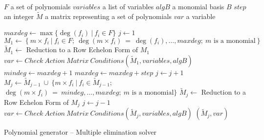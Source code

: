 \begin{algorithm}[ht]
  \begin{algorithmic}[1]
    \Require
      \Statex $F$ a set of polynomials
      \Statex $variables$ a list of variables
      \Statex $algB$ a monomial basis $B$
      \Statex $step$ an integer
    \Ensure
      \Statex $\tilde{M}$ a matrix representing a set of polynomials
      \Statex $var$ a variable
      \Statex

      \State $maxdeg \gets \max\{\deg(f_i)\ |\ f_i \in F\}$
      \State $j \gets 1$
      \State $M_1 \gets \left\{m\times f_i\ |\ f_i \in F;\ \deg(m\times f_i)\ =\ \deg(f_i),\dots,maxdeg;\ m \textrm{ is a monomial} \right\}$
      \State $\tilde{M}_1 \gets$ Reduction to a Row Echelon Form of $M_1$
      \State $var \gets Check\ Action\ Matrix\ Conditions(\tilde{M}_1, variables, algB)$
        \State $mindeg \gets maxdeg + 1$
        \State $maxdeg \gets maxdeg + step$
        \Repeat
          \State $j \gets j + 1$
	  \State $M_j \gets \tilde{M}_{j-1}\ \cup\ \Big\{m \times f_i\ |\ f_i \in \tilde{M}_{j-1};$
	  \StatexIndent[4]$\deg(m\times f_i)\ = \ mindeg,\dots,maxdeg;\ m \textrm{ is a monomial}\Big\}$
          \State $\tilde{M}_j \gets$ Reduction to a Row Echelon Form of $M_j$
        \label{alg:multiElGen:rue}
	\State $j \gets j - 1$\label{alg:multiElGen:shred}
        \State $var \gets Check\ Action\ Matrix\ Conditions(\tilde{M}_j, variables, algB)$
      \EndWhile
      \State \Return $(\tilde{M}_j, var)$
  \end{algorithmic}
  \caption{Polynomial generator -- Multiple elimination solver}
  \label{alg:multiElGen}
\end{algorithm}

